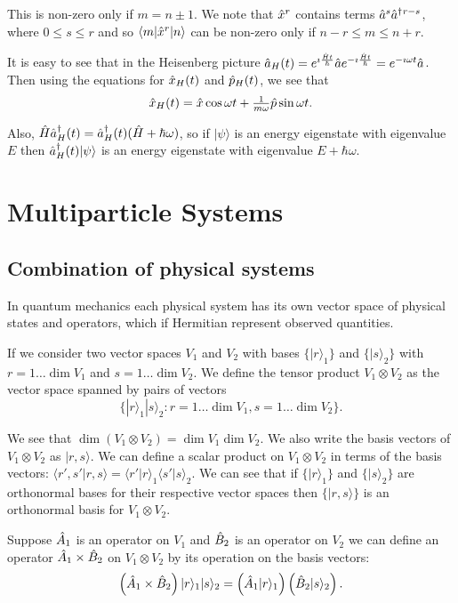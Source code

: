 \documentclass{notes}
\newcommand{\bra}[1]{\langle#1|}
\newcommand{\ket}[1]{|#1\rangle}
\newcommand{\scp}[2]{\langle#1|#2\rangle}
\begin{document}
This is non-zero only if $m = n \pm 1$.  We note that
$\Hat{x}^r$ contains terms $\Hat{a}^s \Hat{a}^\dag{}^{r - s}$,
where $0 \le s \le r$ and so $\bra{m} \Hat{x}^r \ket{n}$ can be non-zero
only if $n-r \le m \le n+r$.

It is easy to see that in the Heisenberg picture $\Hat{a}_H(t)
= e^{\imath \frac{\Hat{H} t}{\hbar}} \Hat{a}
e^{- \imath \frac{\Hat{H} t}{\hbar}} = e^{- \imath \omega t} \Hat{a}$.
Then using the equations for $\Hat{x}_H(t)$ and $\Hat{p}_H(t)$, we
see that
\[
\Hat{x}_H(t) = \Hat{x} \cos \omega t + \tfrac{1}{m \omega} \Hat{p}
\sin \omega t.
\]

Also, $\Hat{H} \Hat{a}_H^\dag(t) = \Hat{a}_H^\dag(t) (\Hat{H} + \hbar \omega)$,
so if $\ket{\psi}$ is an energy eigenstate with eigenvalue $E$ then
$\Hat{a}_H^\dag(t) \ket{\psi}$ is an energy eigenstate with eigenvalue
$E + \hbar \omega$.

\chapter{Multiparticle Systems}

\section{Combination of physical systems}

In quantum mechanics each physical system has its own vector space
of physical states and operators, which if Hermitian represent observed
quantities.

If we consider two vector spaces $V_1$ and $V_2$ with bases
$\{ \ket{r}_1 \}$ and $\{ \ket{s}_2 \}$ with $r = 1 \dots \dim V_1$
and $s = 1 \dots \dim V_2$.  We define the tensor product
$V_1 \otimes V_2$ as the vector space spanned by pairs of vectors
\[
\{ \ket{r}_1 \ket{s}_2 : r = 1 \dots \dim V_1, s = 1 \dots \dim V_2\}.
\]

We see that $\dim (V_1 \otimes V_2) = \dim V_1 \dim V_2$.  We also
write the basis vectors of $V_1 \otimes V_2$ as $\ket{r,s}$.  We can define
a scalar product on $V_1 \otimes V_2$ in terms of the basis vectors:
$\scp{r',s'}{r,s} = \scp{r'}{r}_1 \scp{s'}{s}_2$.  We can see that if
$\{ \ket{r}_1 \}$ and $\{ \ket{s}_2 \}$ are orthonormal bases for their
respective vector spaces then $\{ \ket{r,s} \}$ is an orthonormal basis for
$V_1 \otimes V_2$.

Suppose $\Hat{A}_1$ is an operator on $V_1$ and $\Hat{B}_2$ is an operator
on $V_2$ we can define an operator $\Hat{A}_1 \times \Hat{B}_2$ on
$V_1 \otimes V_2$ by its operation on the basis vectors:
\[
\left(\Hat{A}_1 \times \Hat{B}_2\right) \ket{r}_1 \ket{s}_2
=
\left(\Hat{A}_1 \ket{r}_1 \right)
\left(\Hat{B}_2 \ket{s}_2 \right).
\]
\end{document}
